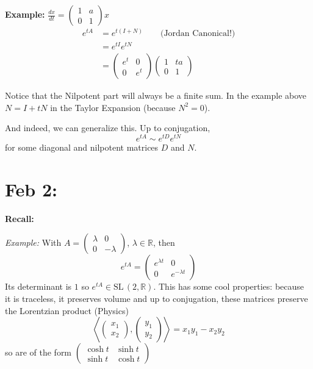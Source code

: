 \documentclass[12pt]{article}
\newcommand{\R}{\mathbb{R}}
\newcommand{\brak}[1]{\left\langle #1 \right\rangle}
\newcommand{\SL}{\text{SL}\,}
\begin{document}
    \textbf{Example:} $\frac{dx}{dt} = \begin{pmatrix}
        1 & a\\ 
        0 & 1
    \end{pmatrix}x$
    \begin{align*}
        e^{tA} &= e^{t(I + N)} \qquad \text{(Jordan Canonical!)}\\ 
            &= e^{tI}e^{tN}\\ 
            &= \begin{pmatrix}
                e^t & 0\\ 
                0 & e^t
            \end{pmatrix} \begin{pmatrix}
                1 & ta\\ 
                0 & 1
            \end{pmatrix}
    \end{align*}

    Notice that the Nilpotent part will always be a finite sum. In the example above $N = I + tN$ in the Taylor Expansion (because $N^2 = 0$).

    And indeed, we can generalize this. Up to conjugation, 
    \[e^{tA} \sim e^{tD} e^{tN}\]
    for some diagonal and nilpotent matrices $D$ and $N$.

\section{Feb 2:}
    \textbf{Recall:} 
    
    \emph{Example:} With $A = \begin{pmatrix}
        \lambda & 0\\ 
        0 & -\lambda
    \end{pmatrix}$, $\lambda \in \R$, then 
    \[e^{tA} = \begin{pmatrix}
        e^{\lambda t} & 0\\ 
        0 & e^{-\lambda t}
    \end{pmatrix}\]
    Its determinant is $1$ so $e^{tA} \in \SL(2, \R)$. This has some cool properties: because it is traceless, it preserves volume and up to conjugation, these matrices preserve the Lorentzian product (Physics) 
    \[\brak{\begin{pmatrix}
        x_1\\x_2
    \end{pmatrix}, \begin{pmatrix}
        y_1\\y_2
    \end{pmatrix}} = x_1 y_1 - x_2 y_2\] 
    so are of the form $\begin{pmatrix}
        \cosh t & \sinh t\\
        \sinh t & \cosh t
    \end{pmatrix}$
\end{document}

